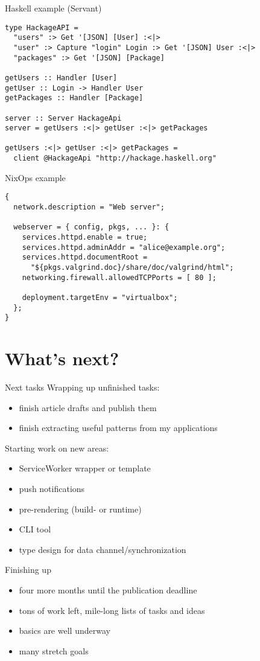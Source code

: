 \documentclass[presentation]{beamer}
\begin{document}
\begin{frame}[fragile,label={sec:orgaa94405}]{Haskell example (Servant)}
 \begin{verbatim}
type HackageAPI =
  "users" :> Get '[JSON] [User] :<|>
  "user" :> Capture "login" Login :> Get '[JSON] User :<|>
  "packages" :> Get '[JSON] [Package]

getUsers :: Handler [User]
getUser :: Login -> Handler User
getPackages :: Handler [Package]

server :: Server HackageApi
server = getUsers :<|> getUser :<|> getPackages

getUsers :<|> getUser :<|> getPackages =
  client @HackageApi "http://hackage.haskell.org"
\end{verbatim}
\end{frame}

\begin{frame}[fragile,label={sec:orgc2c6ee1}]{NixOps example}
 \begin{verbatim}
{
  network.description = "Web server";

  webserver = { config, pkgs, ... }: {
    services.httpd.enable = true;
    services.httpd.adminAddr = "alice@example.org";
    services.httpd.documentRoot =
      "${pkgs.valgrind.doc}/share/doc/valgrind/html";
    networking.firewall.allowedTCPPorts = [ 80 ];

    deployment.targetEnv = "virtualbox";
  };
}
\end{verbatim}
\end{frame}

\section{What's next?}
\label{sec:org04f1493}
\begin{frame}[label={sec:orgb03d11a}]{Next tasks}
Wrapping up unfinished tasks:
\begin{itemize}
\item finish article drafts and publish them
\item finish extracting useful patterns from my applications
\end{itemize}

Starting work on new areas:
\begin{itemize}
\item ServiceWorker wrapper or template
\item push notifications
\item pre-rendering (build- or runtime)
\item CLI tool
\item type design for data channel/synchronization
\end{itemize}
\end{frame}

\begin{frame}[label={sec:orgd881de7}]{Finishing up}
\begin{itemize}
\item four more months until the publication deadline
\item tons of work left, mile-long lists of tasks and ideas
\item basics are well underway
\item many stretch goals
\end{itemize}
\end{frame}
\end{document}
